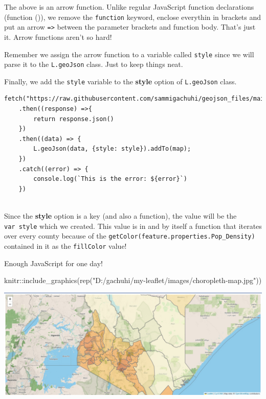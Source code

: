 \documentclass[
]{book}
\newenvironment{Shaded}{\begin{snugshade}}{\end{snugshade}}
\newcommand{\FunctionTok}[1]{\textcolor[rgb]{0.00,0.00,0.00}{#1}}
\newcommand{\NormalTok}[1]{#1}
\newcommand{\SpecialCharTok}[1]{\textcolor[rgb]{0.00,0.00,0.00}{#1}}
\newcommand{\StringTok}[1]{\textcolor[rgb]{0.31,0.60,0.02}{#1}}
\begin{document}
The above is an arrow function. Unlike regular JavaScript function declarations (function ()), we remove the \texttt{function} keyword, enclose everythin in brackets and put an arrow \texttt{=\textgreater{}} between the parameter brackets and function body. That's just it. Arrow functions aren't so hard!

Remember we assign the arrow function to a variable called \texttt{style} since we will parse it to the \texttt{L.geoJson} class. Just to keep things neat.

Finally, we add the \texttt{style} variable to the \textbf{style} option of \texttt{L.geoJson} class.

\begin{verbatim}
fetch("https://raw.githubusercontent.com/sammigachuhi/geojson_files/main/counties_json.json")
    .then((response) =>{
        return response.json()
    })
    .then((data) => {
        L.geoJson(data, {style: style}).addTo(map);
    })
    .catch((error) => {
        console.log(`This is the error: ${error}`)
    })
    
\end{verbatim}

Since the \textbf{style} option is a key (and also a function), the value will be the \texttt{var\ style} which we created. This value is in and by itself a function that iterates over every county because of the \texttt{getColor(feature.properties.Pop\_Density)} contained in it as the \texttt{fillColor} value!

Enough JavaScript for one day!

\begin{Shaded}
\begin{Highlighting}[]
\NormalTok{knitr}\SpecialCharTok{::}\FunctionTok{include\_graphics}\NormalTok{(}\FunctionTok{rep}\NormalTok{(}\StringTok{"D:/gachuhi/my{-}leaflet/images/choropleth{-}map.jpg"}\NormalTok{))}
\end{Highlighting}
\end{Shaded}

\includegraphics[width=26.67in]{../images/choropleth-map}
\end{document}

